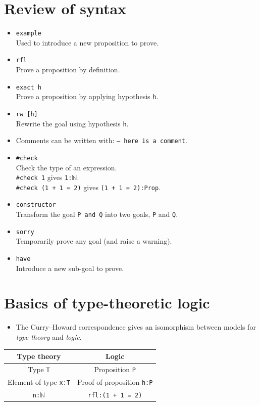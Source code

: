 \documentclass[12pt]{article}
\begin{document}
\section{Review of syntax}
\begin{itemize}
  \item \texttt{example} \\
    Used to introduce a new proposition to prove.
  \item \texttt{rfl} \\
    Prove a proposition by definition.
  \item \texttt{exact h} \\
    Prove a proposition by applying hypothesis \texttt{h}.
  \item \texttt{rw [h]} \\
    Rewrite the goal using hypothesis \texttt{h}.
  \item Comments can be written with: \texttt{-- here is a comment}.
  \item \texttt{\#check} \\
    Check the type of an expression. \\
    \texttt{\#check 1} gives \texttt{1:}$\mathbb{N}$. \\
    \texttt{\#check (1 + 1 = 2)} gives \texttt{(1 + 1 = 2):Prop}.
  \item \texttt{constructor} \\
    Transform the goal \texttt{P and Q} into two goals, \texttt{P} and \texttt{Q}.
  \item \texttt{sorry} \\
    Temporarily prove any goal (and raise a warning).
  \item \texttt{have} \\
    Introduce a new sub-goal to prove.
\end{itemize}

\pagebreak

\section{Basics of type-theoretic logic}

\begin{itemize}
  \item The Curry--Howard correspondence gives an isomorphism between
    models for \emph{type theory} and \emph{logic}.
\end{itemize}

\begin{table}[H]
  \begin{center}
    \begin{tabular}{|c|c|}
      \hline
      Type theory & Logic \\
      \hline
      Type \texttt{T} & Proposition \texttt{P} \\
      Element of type \texttt{x:T} & Proof of proposition \texttt{h:P} \\
      \texttt{n:}$\mathbb{N}$ & \texttt{rfl:(1 + 1 = 2)} \\
      \hline
    \end{tabular}
  \end{center}
\end{table}
\end{document}
